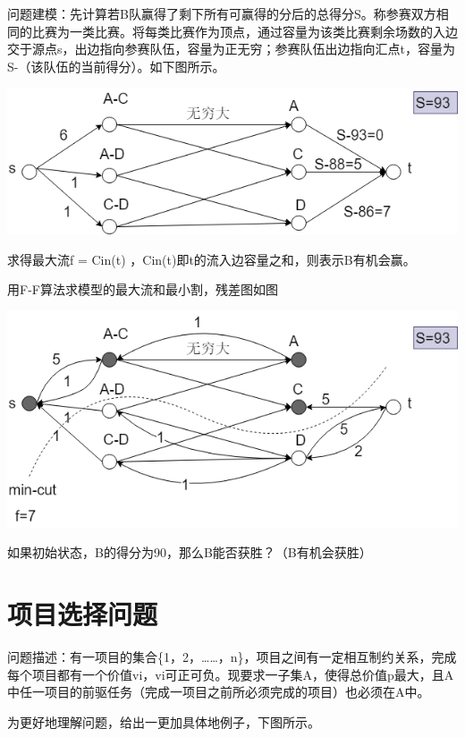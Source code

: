 问题建模：先计算若B队赢得了剩下所有可赢得的分后的总得分S。称参赛双方相同的比赛为一类比赛。将每类比赛作为顶点，通过容量为该类比赛剩余场数的入边交于源点s，出边指向参赛队伍，容量为正无穷；参赛队伍出边指向汇点t，容量为S-（该队伍的当前得分）。如下图所示。

\centerline{\includegraphics[scale=0.6]{Ln11.image/networkflow6.png}}

求得最大流f = Cin(t) ，Cin(t)即t的流入边容量之和，则表示B有机会赢。

用F-F算法求模型的最大流和最小割，残差图如图

\centerline{\includegraphics[scale=0.6]{Ln11.image/networkflow7.png}}

如果初始状态，B的得分为90，那么B能否获胜？（B有机会获胜）

\section{项目选择问题}
问题描述：有一项目的集合\{1，2，……，n\}，项目之间有一定相互制约关系，完成每个项目都有一个价值vi，vi可正可负。现要求一子集A，使得总价值p最大，且A中任一项目的前驱任务（完成一项目之前所必须完成的项目）也必须在A中。

为更好地理解问题，给出一更加具体地例子，下图所示。

